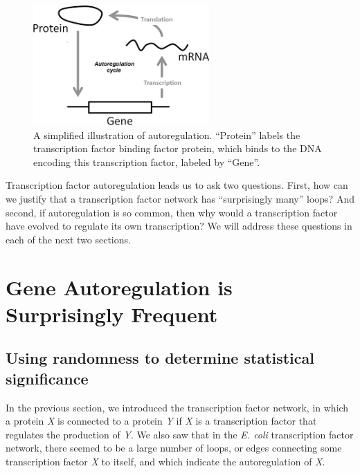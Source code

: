 \begin{figure}[h]
\centering
\mySfFamily
\includegraphics[width = 0.6\textwidth]{../images/autoregulation_example.png}
\caption{A simplified illustration of autoregulation. ``Protein'' labels the transcription factor binding factor protein, which binds to the DNA encoding this transcription factor, labeled by ``Gene''.}
\label{fig:autoregulation_example}
\end{figure}

Transcription factor autoregulation leads us to ask two questions. First, how can we justify that a transcription factor network has ``surprisingly many'' loops? And second, if autoregulation is so common, then why would a transcription factor have evolved to regulate its own transcription? We will address these questions in each of the next two sections.


\FloatBarrier
{}

\section{Gene Autoregulation is Surprisingly Frequent}
\label{sec:gene_autoregulation_is_surprisingly_frequent}

\subsection{Using randomness to determine statistical significance}

In the previous section, we introduced the transcription factor network, in which a protein \textit{X} is connected to a protein \textit{Y} if \textit{X} is a transcription factor that regulates the production of \textit{Y}. We also saw that in the \textit{E. coli} transcription factor network, there seemed to be a large number of loops, or edges connecting some transcription factor \textit{X} to itself, and which indicate the autoregulation of \textit{X}.


